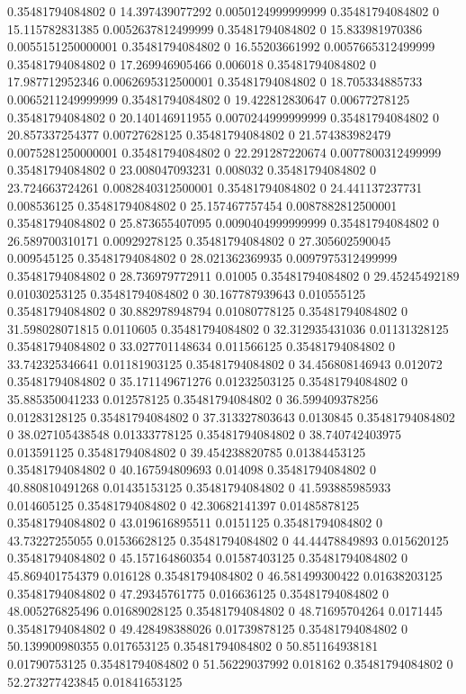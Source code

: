 0.35481794084802 0 14.397439077292 0.0050124999999999
0.35481794084802 0 15.115782831385 0.0052637812499999
0.35481794084802 0 15.833981970386 0.0055151250000001
0.35481794084802 0 16.55203661992 0.0057665312499999
0.35481794084802 0 17.269946905466 0.006018
0.35481794084802 0 17.987712952346 0.0062695312500001
0.35481794084802 0 18.705334885733 0.0065211249999999
0.35481794084802 0 19.422812830647 0.00677278125
0.35481794084802 0 20.140146911955 0.0070244999999999
0.35481794084802 0 20.857337254377 0.00727628125
0.35481794084802 0 21.574383982479 0.0075281250000001
0.35481794084802 0 22.291287220674 0.0077800312499999
0.35481794084802 0 23.008047093231 0.008032
0.35481794084802 0 23.724663724261 0.0082840312500001
0.35481794084802 0 24.441137237731 0.008536125
0.35481794084802 0 25.157467757454 0.0087882812500001
0.35481794084802 0 25.873655407095 0.0090404999999999
0.35481794084802 0 26.589700310171 0.00929278125
0.35481794084802 0 27.305602590045 0.009545125
0.35481794084802 0 28.021362369935 0.0097975312499999
0.35481794084802 0 28.736979772911 0.01005
0.35481794084802 0 29.45245492189 0.01030253125
0.35481794084802 0 30.167787939643 0.010555125
0.35481794084802 0 30.882978948794 0.01080778125
0.35481794084802 0 31.598028071815 0.0110605
0.35481794084802 0 32.312935431036 0.01131328125
0.35481794084802 0 33.027701148634 0.011566125
0.35481794084802 0 33.742325346641 0.01181903125
0.35481794084802 0 34.456808146943 0.012072
0.35481794084802 0 35.171149671276 0.01232503125
0.35481794084802 0 35.885350041233 0.012578125
0.35481794084802 0 36.599409378256 0.01283128125
0.35481794084802 0 37.313327803643 0.0130845
0.35481794084802 0 38.027105438548 0.01333778125
0.35481794084802 0 38.740742403975 0.013591125
0.35481794084802 0 39.454238820785 0.01384453125
0.35481794084802 0 40.167594809693 0.014098
0.35481794084802 0 40.880810491268 0.01435153125
0.35481794084802 0 41.593885985933 0.014605125
0.35481794084802 0 42.30682141397 0.01485878125
0.35481794084802 0 43.019616895511 0.0151125
0.35481794084802 0 43.73227255055 0.01536628125
0.35481794084802 0 44.44478849893 0.015620125
0.35481794084802 0 45.157164860354 0.01587403125
0.35481794084802 0 45.869401754379 0.016128
0.35481794084802 0 46.581499300422 0.01638203125
0.35481794084802 0 47.29345761775 0.016636125
0.35481794084802 0 48.005276825496 0.01689028125
0.35481794084802 0 48.71695704264 0.0171445
0.35481794084802 0 49.428498388026 0.01739878125
0.35481794084802 0 50.139900980355 0.017653125
0.35481794084802 0 50.851164938181 0.01790753125
0.35481794084802 0 51.56229037992 0.018162
0.35481794084802 0 52.273277423845 0.01841653125
